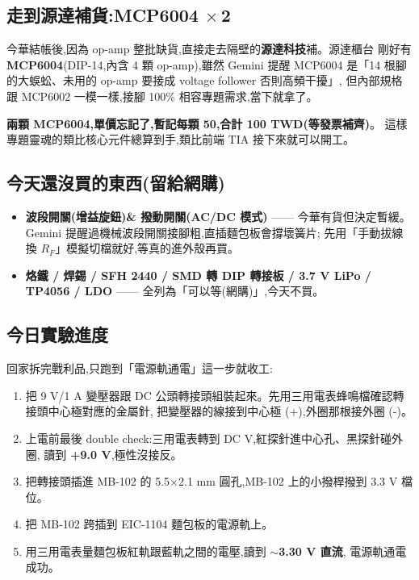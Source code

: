 \subsection*{走到源達補貨:MCP6004 \(\times\,\)2}

今華結帳後,因為 op-amp 整批缺貨,直接走去隔壁的\textbf{源達科技}補。源達櫃台
剛好有 \textbf{MCP6004}(DIP-14,內含 4 顆 op-amp),雖然 Gemini 提醒 MCP6004
是「14 根腳的大蜈蚣、未用的 op-amp 要接成 voltage follower 否則高頻干擾」,
但內部規格跟 MCP6002 一模一樣,接腳 100\% 相容專題需求,當下就拿了。

\textbf{兩顆 MCP6004,單價忘記了,暫記每顆 50,合計 100 TWD(等發票補齊)}。
這樣專題靈魂的類比核心元件總算到手,類比前端 TIA 接下來就可以開工。

\subsection*{今天還沒買的東西(留給網購)}

\begin{itemize}[leftmargin=2em,itemsep=0pt]
  \item \textbf{波段開關(增益旋鈕)\& 撥動開關(AC/DC 模式)} —— 今華有貨但決定暫緩。
        Gemini 提醒過機械波段開關接腳粗,直插麵包板會撐壞簧片;
        先用「手動拔線換 \(R_F\)」模擬切檔就好,等真的進外殼再買。
  \item \textbf{烙鐵 / 焊錫 / SFH 2440 / SMD 轉 DIP 轉接板 / 3.7 V LiPo / TP4056 / LDO} ——
        全列為「可以等(網購)」,今天不買。
\end{itemize}

\subsection*{今日實驗進度}

回家拆完戰利品,只跑到「電源軌通電」這一步就收工:

\begin{enumerate}[leftmargin=2em,itemsep=2pt]
  \item 把 9 V/1 A 變壓器跟 DC 公頭轉接頭組裝起來。先用三用電表蜂鳴檔確認轉接頭中心極對應的金屬針,
        把變壓器的線接到中心極 (+),外圈那根接外圈 (-)。
  \item 上電前最後 double check:三用電表轉到 DC V,紅探針進中心孔、黑探針碰外圈,
        讀到 \textbf{+9.0 V},極性沒接反。
  \item 把轉接頭插進 MB-102 的 5.5$\times$2.1 mm 圓孔,MB-102 上的小撥桿撥到 3.3 V 檔位。
  \item 把 MB-102 跨插到 EIC-1104 麵包板的電源軌上。
  \item 用三用電表量麵包板紅軌跟藍軌之間的電壓,讀到 \textbf{\(\sim\)3.30 V 直流},
        電源軌通電成功。
\end{enumerate}

